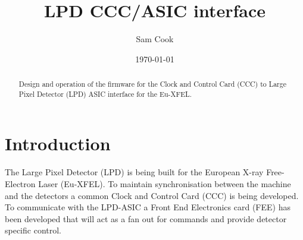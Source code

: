 \documentclass[]{report}
\title{LPD CCC/ASIC interface}
\author{ Sam Cook }
\date{\today}
\begin{document}
    \ifpdf
    \else
    \fi

    \maketitle

    \begin{abstract}
        Design and operation of the firmware for the Clock and Control Card (CCC) to Large Pixel Detector (LPD) ASIC interface for the Eu-XFEL. 
    \end{abstract}
    \tableofcontents
    \chapter{Introduction} %
    \label{sec:introduction}
    The Large Pixel Detector (LPD) is being built for the European X-ray Free-Electron Laser (Eu-XFEL). To maintain synchronisation between the machine and the detectors a common Clock and Control Card (CCC) is being developed. To communicate with the LPD-ASIC a Front End Electronics card (FEE) has been developed that will act as a fan out for commands and provide detector specific control.
    
\end{document}

